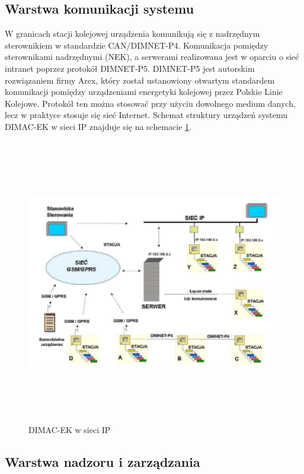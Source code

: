 \subsection{Warstwa komunikacji systemu}
W granicach stacji kolejowej urządzenia komunikują się z nadrzędnym sterownikiem w standardzie CAN/DIMNET-P4\cite{dimacek-wytyczne}.
Komunikacja pomiędzy sterownikami nadrzędnymi (NEK), a serwerami realizowana jest w oparciu o sieć intranet poprzez protokół DIMNET-P5. DIMNET-P5 jest autorskim rozwiązaniem firmy Arex, który został ustanowiony otwartym standardem komunikacji pomiędzy urządzeniami energetyki kolejowej przez Polskie Linie Kolejowe. Protokół ten można stosować przy użyciu dowolnego medium danych, lecz w praktyce stosuje się sieć Internet. Schemat struktury urządzeń systemu DIMAC-EK w sieci IP znajduje się na schemacie \ref{fig:dimacek_ip}.


\begin{figure}[t]
	\centerline{\includegraphics[height=125mm]{./img/dimacek_ip.png}}
	\caption[DIMAC-EK w sieci IP]{DIMAC-EK w sieci IP \cite{arex-materials}}
	\label{fig:dimacek_ip}
\end{figure}


\subsection{Warstwa nadzoru i zarządzania}

